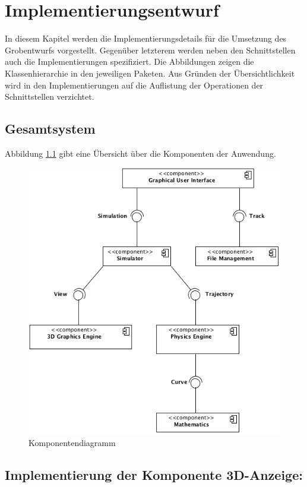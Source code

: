 \chapter{Implementierungsentwurf}

In diesem Kapitel werden die Implementierungsdetails für die Umsetzung des
Grobentwurfs vorgestellt. Gegenüber letzterem werden neben den Schnittstellen
auch die Implementierungen spezifiziert. Die Abbildungen zeigen die 
Klassenhierarchie in den jeweiligen Paketen. Aus Gründen der Übersichtlichkeit
wird in den Implementierungen auf die Auflistung der Operationen der Schnittstellen
verzichtet.

\section{Gesamtsystem}
Abbildung \ref{fig:components} gibt eine Übersicht über die Komponenten der Anwendung.

\begin{figure}[!h]
	\includegraphics[width=0.8\linewidth]{bilder/components.png}
\caption{Komponentendiagramm}
\label{fig:components}
\end{figure}

\newpage

\section{Implementierung der Komponente 3D-Anzeige:}

